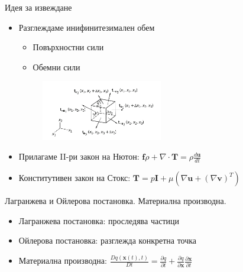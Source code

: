 \documentclass{beamer}
\begin{document}
\begin{frame}{Идея за извеждане}
\begin{itemize}[<+->]
	\item Разглеждаме инифинитезимален обем
		\begin{itemize}
			\item Повърхностни сили
			\item Обемни сили
		\end{itemize}
	\begin{figure}[H]
  		\centering
  		\includegraphics[width=0.5\textwidth]{infinitesimal_cube.png}
	\end{figure}
	\item Прилагаме II-ри закон на Нютон: $\boldsymbol{f}\rho + \nabla \cdot \boldsymbol{T} = \rho\frac{d\boldsymbol{u}}{dt}$
	\item Конститутивен закон на Стокс: $\boldsymbol{T} = p\boldsymbol{I} + \mu(\nabla\boldsymbol{u} + (\nabla\boldsymbol{v})^T)$
\end{itemize}
\end{frame}

\begin{frame}{Лагранжева и Ойлерова постановка. Материална производна.}
	\begin{itemize}[<+->]
		\item Лагранжева постановка: проследява частици
		\item Ойлерова постановка: разглежда конкретна точка
		\item Материална производна: $\frac{Dq(\boldsymbol{x}(t), t)}{Dt} = \frac{\partial q}{\partial t} + \frac{\partial q}{\partial \boldsymbol{x}}\frac{\partial \boldsymbol{x}}{\partial t}$
	\end{itemize}
\end{frame}
\end{document}
